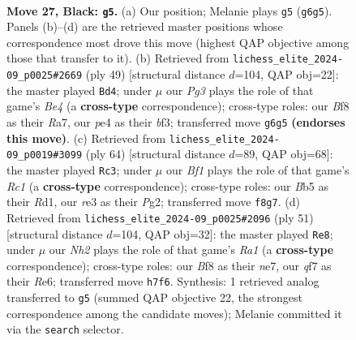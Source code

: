 \documentclass[11pt]{article}
\begin{document}
\clearpage

\begin{figure}[p]\centering
\begin{subfigure}{0.46\textwidth}\centering
\resizebox{\linewidth}{!}{%
\newchessgame
\chessboard[
  setfen={1k3b1r/1p2pQ1n/1r1p2p1/1b6/3PP3/1P2RP2/6PP/1K5R b - - 0 27},
  showmover=false,
  pgfstyle=straightmove, color=movearrow, markmove={g6-g5}
]}
\caption{}
\end{subfigure}\hfill
\begin{subfigure}{0.46\textwidth}\centering
\resizebox{\linewidth}{!}{%
\newchessgame
\chessboard[
  setfen={4r1k1/r4p1p/pQ4p1/4b3/P7/2q2BP1/5P1P/R4RK1 b - - 0 25},
  showmover=false,
  pgfstyle=straightmove, color=movearrow, markmove={e5-d4}
]}
\caption{}
\end{subfigure}
\\[4pt]
\begin{subfigure}{0.46\textwidth}\centering
\resizebox{\linewidth}{!}{%
\newchessgame
\chessboard[
  setfen={r1b3k1/5pp1/4p2p/1P2P3/1PPB1q1P/p4N2/K5P1/2RR4 w - - 0 33},
  showmover=false,
  pgfstyle=straightmove, color=movearrow, markmove={c1-c3}
]}
\caption{}
\end{subfigure}\hfill
\begin{subfigure}{0.46\textwidth}\centering
\resizebox{\linewidth}{!}{%
\newchessgame
\chessboard[
  setfen={r7/pQb1Nk1p/4rp2/2p5/8/2PppK1P/PP4P1/R4BR1 b - - 0 26},
  showmover=false,
  pgfstyle=straightmove, color=movearrow, markmove={a8-e8}
]}
\caption{}
\end{subfigure}
\caption{\textbf{Move 27, Black: \texttt{g5}.} (a) Our position; Melanie plays \texttt{g5} (\texttt{g6g5}). Panels (b)--(d) are the retrieved master positions whose correspondence most drove this move (highest QAP objective among those that transfer to it). (b) Retrieved from \texttt{lichess\_elite\_2024-09\_p0025\#2669} (ply 49) [structural distance $d$=104, QAP obj=22]: the master played \texttt{Bd4}; under $\mu$ our \emph{Pg3} plays the role of that game's \emph{Be4} (a \textbf{cross-type} correspondence); cross-type roles: our \emph{B}f8 as their \emph{R}a7, our \emph{p}e4 as their \emph{b}f3; transferred move \texttt{g6g5} \textbf{(endorses this move)}. (c) Retrieved from \texttt{lichess\_elite\_2024-09\_p0019\#3099} (ply 64) [structural distance $d$=89, QAP obj=68]: the master played \texttt{Rc3}; under $\mu$ our \emph{Bf1} plays the role of that game's \emph{Rc1} (a \textbf{cross-type} correspondence); cross-type roles: our \emph{B}b5 as their \emph{R}d1, our \emph{r}e3 as their \emph{P}g2; transferred move \texttt{f8g7}. (d) Retrieved from \texttt{lichess\_elite\_2024-09\_p0025\#2096} (ply 51) [structural distance $d$=104, QAP obj=32]: the master played \texttt{Re8}; under $\mu$ our \emph{Nh2} plays the role of that game's \emph{Ra1} (a \textbf{cross-type} correspondence); cross-type roles: our \emph{B}f8 as their \emph{n}e7, our \emph{q}f7 as their \emph{R}e6; transferred move \texttt{h7f6}. Synthesis: 1 retrieved analog transferred to \texttt{g5} (summed QAP objective 22, the strongest correspondence among the candidate moves); Melanie committed it via the \texttt{search} selector.}
\label{fig:thought-m53}
\end{figure}
\end{document}
